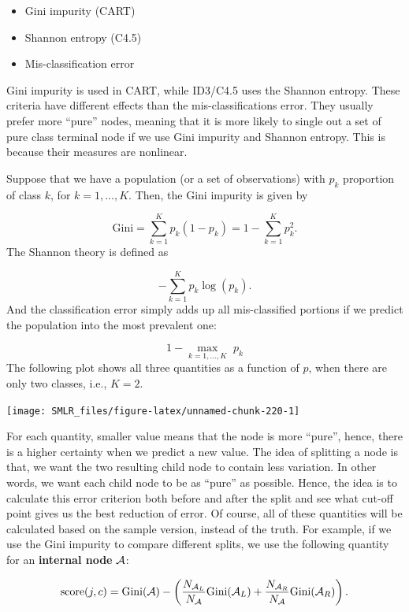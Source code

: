 \documentclass[
]{book}
\providecommand{\tightlist}{%
  \setlength{\itemsep}{0pt}\setlength{\parskip}{0pt}}
\theoremstyle{definition}
\theoremstyle{definition}
\theoremstyle{definition}
\theoremstyle{definition}
\theoremstyle{remark}
\begin{document}
\begin{itemize}
\tightlist
\item
  Gini impurity (CART)
\item
  Shannon entropy (C4.5)
\item
  Mis-classification error
\end{itemize}

Gini impurity is used in CART, while ID3/C4.5 uses the Shannon entropy. These criteria have different effects than the mis-classifications error. They usually prefer more ``pure'' nodes, meaning that it is more likely to single out a set of pure class terminal node if we use Gini impurity and Shannon entropy. This is because their measures are nonlinear.

Suppose that we have a population (or a set of observations) with \(p_k\) proportion of class \(k\), for \(k = 1, \ldots, K\). Then, the Gini impurity is given by

\[ \text{Gini} = \sum_{k = 1}^K p_k (1 - p_k) = 1 - \sum_{k=1}^K p_k^2.\]
The Shannon theory is defined as

\[- \sum_{k=1}^K p_k \log(p_k).\]
And the classification error simply adds up all mis-classified portions if we predict the population into the most prevalent one:

\[ 1 - \underset{k = 1, \ldots, K}{\max} \,\, p_k\]
The following plot shows all three quantities as a function of \(p\), when there are only two classes, i.e., \(K = 2\).

\begin{center}\texttt{[image: SMLR\_files/figure-latex/unnamed-chunk-220-1]} \end{center}

For each quantity, smaller value means that the node is more ``pure'', hence, there is a higher certainty when we predict a new value. The idea of splitting a node is that, we want the two resulting child node to contain less variation. In other words, we want each child node to be as ``pure'' as possible. Hence, the idea is to calculate this error criterion both before and after the split and see what cut-off point gives us the best reduction of error. Of course, all of these quantities will be calculated based on the sample version, instead of the truth. For example, if we use the Gini impurity to compare different splits, we use the following quantity for an \textbf{internal node} \({\cal A}\):

\begin{align}
\text{score}(j, c) = \text{Gini}({\cal A}) - \left( \frac{N_{{\cal A}_L}}{N_{{\cal A}}} \text{Gini}({\cal A}_L) + \frac{N_{{\cal A}_R}}{N_{{\cal A}}} \text{Gini}({\cal A}_R)  \right).
\end{align}
\end{document}
